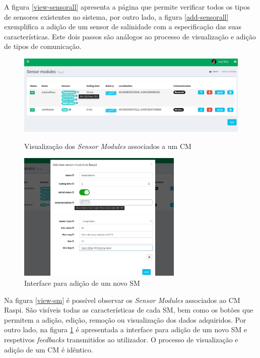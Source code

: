 A figura \ref{view-sensorall} apresenta a página que permite verificar todos os tipos de sensores existentes no sistema, por outro lado, a figura \ref{add-sensorall} exemplifica a adição de um sensor de salinidade com a especificação das suas características. Este dois passos são análogos ao processo de visualização e adição de tipos de comunicação.




\begin{figure}[h]
	\centering
	\begin{minipage}[b]{0.49\textwidth}
		\centering
		\includegraphics[width=\textwidth]{prints-web/sm_show.png}
		\caption{Visualização dos \textit{Sensor Modules} associados a um \acl{CM} }
		\label{view-sm}
	\end{minipage}
	\hfill
	\begin{minipage}[b]{0.49\textwidth}
		\centering
		\includegraphics[width=0.7\textwidth]{prints-web/sm_add.png}
		\caption{Interface para adição de um novo \acl{SM} }
		\label{add-sm}
	\end{minipage}
\end{figure}



Na figura \ref{view-sm} é possível observar os \textit{Sensor Modules} associados ao \acl{CM} Raspi. São visíveis todas as características de cada \acl{SM}, bem como os botões que permitem a adição, edição, remoção ou visualização dos dados adquiridos. Por outro lado, na figura \ref{add-sm} é apresentada a interface para adição de um novo \acl{SM} e respetivos \textit{feedbacks} transmitidos ao utilizador. O processo de visualização e adição de um \acl{CM} é idêntico. 


